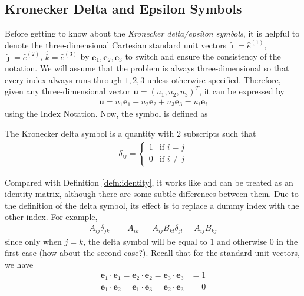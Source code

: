 \subsection{Kronecker Delta and Epsilon Symbols}

Before getting to know about the \textit{Kronecker delta/epsilon symbols}, it is helpful to denote the three-dimensional Cartesian standard unit vectors $\hat{\imath} = \hat{e}^{(1)}$, $\hat{\jmath} = \hat{e}^{(2)}$, $\hat{k} = \hat{e}^{(3)}$ by $\textbf{e}_1, \textbf{e}_2, \textbf{e}_3$ to switch and ensure the consistency of the notation. We will assume that the problem is always three-dimensional so that every index always runs through $1,2,3$ unless otherwise specified. Therefore, given any three-dimensional vector $\textbf{u} = (u_1, u_2, u_3)^T$, it can be expressed by 
\begin{align}
\textbf{u} = u_1 \textbf{e}_1 + u_2 \textbf{e}_2 + u_3 \textbf{e}_3 = u_i \textbf{e}_i
\end{align}
using the Index Notation. Now, the  symbol is defined as
\begin{defn}
The Kronecker delta symbol is a quantity with $2$ subscripts such that
\begin{align}
\delta_{ij} = \begin{cases}
1 & \text{if $i=j$} \\
0 & \text{if $i\neq j$}
\end{cases}    
\label{eqn:krondef}
\end{align}
\end{defn}
Compared with Definition \ref{defn:identity}, it works like and can be treated as an identity matrix, although there are some subtle differences between them. Due to the definition of the delta symbol, its effect is to replace a dummy index with the other index. For example,
\begin{align*}
A_{ij}\delta_{jk} &= A_{ik} & & A_{ij}B_{kl}\delta_{jl} = A_{ij}B_{kj}
\end{align*}
since only when $j = k$, the delta symbol will be equal to $1$ and otherwise $0$ in the first case (how about the second case?). Recall that for the standard unit vectors, we have
\begin{subequations}
\begin{align}
\textbf{e}_1 \cdot \textbf{e}_1 = \textbf{e}_2 \cdot \textbf{e}_2 = \textbf{e}_3 \cdot \textbf{e}_3 &= 1 \\
\textbf{e}_1 \cdot \textbf{e}_2 = \textbf{e}_1 \cdot \textbf{e}_3 = \textbf{e}_2 \cdot \textbf{e}_3 &= 0
\end{align}
\end{subequations}
